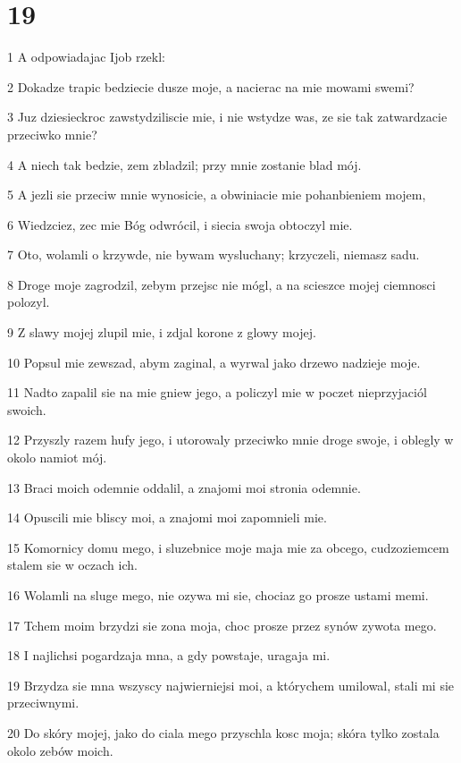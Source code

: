 \chapter{19}

\par 1 A odpowiadajac Ijob rzekl:
\par 2 Dokadze trapic bedziecie dusze moje, a nacierac na mie mowami swemi?
\par 3 Juz dziesieckroc zawstydziliscie mie, i nie wstydze was, ze sie tak zatwardzacie przeciwko mnie?
\par 4 A niech tak bedzie, zem zbladzil; przy mnie zostanie blad mój.
\par 5 A jezli sie przeciw mnie wynosicie, a obwiniacie mie pohanbieniem mojem,
\par 6 Wiedzciez, zec mie Bóg odwrócil, i siecia swoja obtoczyl mie.
\par 7 Oto, wolamli o krzywde, nie bywam wysluchany; krzyczeli, niemasz sadu.
\par 8 Droge moje zagrodzil, zebym przejsc nie mógl, a na scieszce mojej ciemnosci polozyl.
\par 9 Z slawy mojej zlupil mie, i zdjal korone z glowy mojej.
\par 10 Popsul mie zewszad, abym zaginal, a wyrwal jako drzewo nadzieje moje.
\par 11 Nadto zapalil sie na mie gniew jego, a policzyl mie w poczet nieprzyjaciól swoich.
\par 12 Przyszly razem hufy jego, i utorowaly przeciwko mnie droge swoje, i oblegly w okolo namiot mój.
\par 13 Braci moich odemnie oddalil, a znajomi moi stronia odemnie.
\par 14 Opuscili mie bliscy moi, a znajomi moi zapomnieli mie.
\par 15 Komornicy domu mego, i sluzebnice moje maja mie za obcego, cudzoziemcem stalem sie w oczach ich.
\par 16 Wolamli na sluge mego, nie ozywa mi sie, chociaz go prosze ustami memi.
\par 17 Tchem moim brzydzi sie zona moja, choc prosze przez synów zywota mego.
\par 18 I najlichsi pogardzaja mna, a gdy powstaje, uragaja mi.
\par 19 Brzydza sie mna wszyscy najwierniejsi moi, a którychem umilowal, stali mi sie przeciwnymi.
\par 20 Do skóry mojej, jako do ciala mego przyschla kosc moja; skóra tylko zostala okolo zebów moich.
